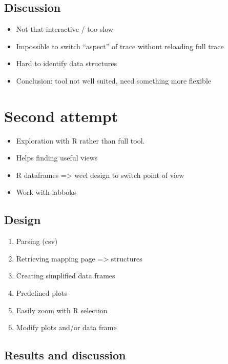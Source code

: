 \subsection{Discussion}

\begin{itemize}
    \item  Not that interactive / too slow
    \item  Impossible to switch “aspect” of trace without reloading full trace
    \item  Hard to identify data structures
    \item  Conclusion: tool not well suited, need something more flexible
\end{itemize}

\section{Second attempt}
\label{sec:visu-second}

\begin{itemize}
    \item Exploration with R rather than full tool.
    \item Helps finding useful views
    \item R dataframes => weel design to switch point of view
    \item Work with labboks 
\end{itemize}

\subsection{Design}

\begin{enumerate}
    \item Parsing (csv)
    \item Retrieving mapping page => structures
    \item Creating simplified data frames
    \item Predefined plots
    \item Easily zoom  with R selection
    \item Modify plots and/or data frame
\end{enumerate}

\subsection{Results and discussion}

